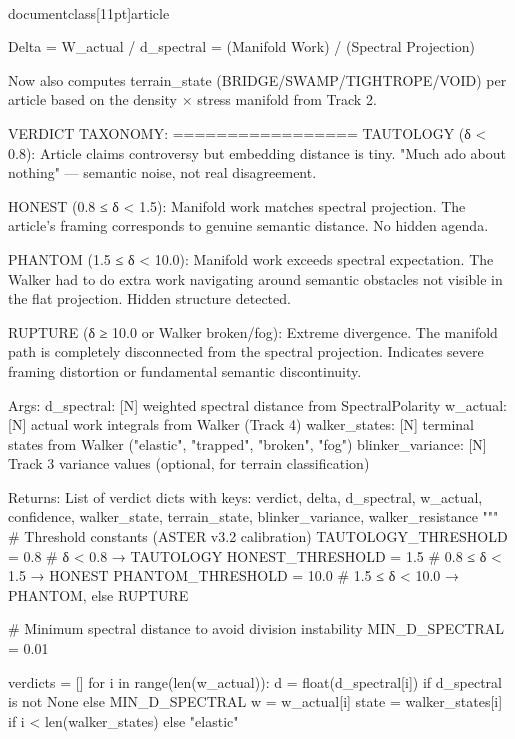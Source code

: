 \\documentclass[11pt]{article}
\begin{document}
\begin{CodeBlock}
        Delta = W_actual / d_spectral = (Manifold Work) / (Spectral Projection)

        Now also computes terrain_state (BRIDGE/SWAMP/TIGHTROPE/VOID) per article
        based on the density × stress manifold from Track 2.

        VERDICT TAXONOMY:
        =================
        TAUTOLOGY (δ < 0.8):
            Article claims controversy but embedding distance is tiny.
            "Much ado about nothing" — semantic noise, not real disagreement.

        HONEST (0.8 ≤ δ < 1.5):
            Manifold work matches spectral projection. The article's framing
            corresponds to genuine semantic distance. No hidden agenda.

        PHANTOM (1.5 ≤ δ < 10.0):
            Manifold work exceeds spectral expectation. The Walker had to do
            extra work navigating around semantic obstacles not visible in
            the flat projection. Hidden structure detected.

        RUPTURE (δ ≥ 10.0 or Walker broken/fog):
            Extreme divergence. The manifold path is completely disconnected
            from the spectral projection. Indicates severe framing distortion
            or fundamental semantic discontinuity.

        Args:
            d_spectral: [N] weighted spectral distance from SpectralPolarity
            w_actual: [N] actual work integrals from Walker (Track 4)
            walker_states: [N] terminal states from Walker ("elastic", "trapped", "broken", "fog")
            blinker_variance: [N] Track 3 variance values (optional, for terrain classification)

        Returns:
            List of verdict dicts with keys: verdict, delta, d_spectral, w_actual, confidence,
            walker_state, terrain_state, blinker_variance, walker_resistance
        """
        # Threshold constants (ASTER v3.2 calibration)
        TAUTOLOGY_THRESHOLD = 0.8   # δ < 0.8 → TAUTOLOGY
        HONEST_THRESHOLD = 1.5      # 0.8 ≤ δ < 1.5 → HONEST
        PHANTOM_THRESHOLD = 10.0    # 1.5 ≤ δ < 10.0 → PHANTOM, else RUPTURE

        # Minimum spectral distance to avoid division instability
        MIN_D_SPECTRAL = 0.01

        verdicts = []
        for i in range(len(w_actual)):
            d = float(d_spectral[i]) if d_spectral is not None else MIN_D_SPECTRAL
            w = w_actual[i]
            state = walker_states[i] if i < len(walker_states) else "elastic"


\end{CodeBlock}
\end{document}
